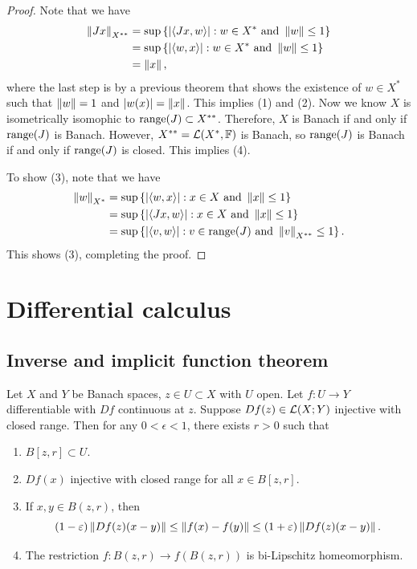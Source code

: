 \documentclass[a4paper]{article}
\begin{document}
\begin{proof}
Note that we have
\[
\begin{aligned}
\left\lVert Jx\right\rVert_{X^{**}}
&= \sup \left\{ \left\lvert \left\langle Jx, w \right\rangle\right\rvert: w \in X^* \text{ and } \left\lVert w\right\rVert \leq 1 \right\} \\
&= \sup \left\{ \left\lvert \left\langle w, x \right\rangle\right\rvert: w \in X^* \text{ and } \left\lVert w\right\rVert \leq 1 \right\} \\
&= \left\lVert x\right\rVert,
\end{aligned}
\]
where the last step is by a previous theorem that shows
the existence of $w \in X^*$ such that $\left\lVert w\right\rVert = 1$ and
$\left\lvert w(x)\right\rvert = \left\lVert x\right\rVert$. This implies (1) and (2).
Now we know $X$ is isometrically isomophic to $\operatorname{range}(J) \subset
X^{**}$. Therefore, $X$ is Banach if and only if $\operatorname{range}(J)$ is
Banach. However, $X^{**} = \mathcal{L}(X^*, \mathbb{F})$ is Banach, so
$\operatorname{range}(J)$ is Banach if and only if $\operatorname{range}(J)$ is closed.
This implies (4).

To show (3), note that we have
\[
\begin{aligned}
\left\lVert w\right\rVert_{X^*}
&= \sup \left\{ \left\lvert \left\langle w, x \right\rangle\right\rvert : x \in X \text{ and } \left\lVert x\right\rVert \leq 1 \right\} \\
&= \sup \left\{ \left\lvert \left\langle Jx, w \right\rangle\right\rvert : x \in X \text{ and } \left\lVert x\right\rVert \leq 1 \right\} \\
&= \sup \left\{ \left\lvert \left\langle v, w \right\rangle\right\rvert : v \in \operatorname{range}(J) \text{ and } \left\lVert v\right\rVert_{X^{**}} \leq 1 \right\}.
\end{aligned}
\]
This shows (3), completing the proof.
\end{proof}

\section{Differential calculus}

\subsection{Inverse and implicit function theorem}

\begin{thm}
Let $X$ and $Y$ be Banach spaces, $z \in U \subset X$
with $U$ open. Let $f: U \to Y$ differentiable with
$Df$ continuous at $z$. Suppose $Df(z) \in \mathcal{L}(X; Y)$
injective with closed range. Then for any $0 < \epsilon < 1$,
there exists $r > 0$ such that
\begin{enumerate}
  \item $B[z, r] \subset U$.
  \item $Df(x)$ injective with closed range for all $x \in
  B[z, r]$.
  \item If $x, y \in B(z, r)$, then
  \[
  (1 - \varepsilon) \left\lVert Df(z) (x - y)\right\rVert
  \leq \left\lVert f(x) - f(y)\right\rVert
  \leq (1 + \varepsilon) \left\lVert Df(z) (x - y)\right\rVert.
  \]
  \item The restriction $f: B(z, r) \to f(B(z, r))$
  is bi-Lipschitz homeomorphism.
\end{enumerate}
\end{thm}
\end{document}
